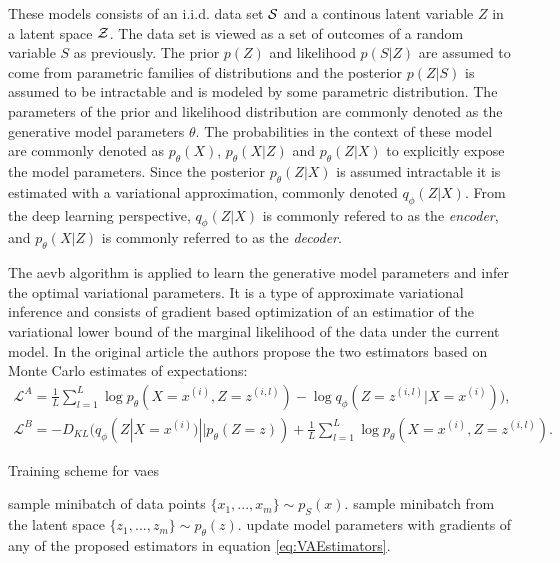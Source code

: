 These models consists of an i.i.d. data set $\mathcal{S}$ and a continous latent variable $Z$ in a latent space $\mathcal{Z}$. The data set is viewed as a set of outcomes of a random variable $S$ as previously. The prior $p(Z)$ and likelihood $p(S|Z)$ are assumed to come from parametric families of distributions and the posterior $p(Z|S)$ is assumed to be intractable and is modeled by some parametric distribution. The parameters of the prior and likelihood distribution are commonly denoted as the generative model parameters $\theta$. The probabilities in the context of these model are commonly denoted as $p_\theta(X)$, $p_\theta(X|Z)$ and $p_\theta(Z|X)$ to explicitly expose the model parameters. Since the posterior $p_\theta(Z|X)$ is assumed intractable it is estimated with a variational approximation, commonly denoted $q_\phi(Z|X)$. From the deep learning perspective, $q_\phi(Z|X)$ is commonly refered to as the \textit{encoder}, and $p_\theta(X|Z)$ is commonly referred to as the \textit{decoder}.

The \acrshort{aevb} algorithm is applied to learn the generative model parameters and infer the optimal variational parameters. It is a type of approximate variational inference and consists of gradient based optimization of an estimatior of the variational lower bound of the marginal likelihood of the data under the current model. In the original article the authors propose the two estimators based on Monte Carlo estimates of expectations:
\begin{equation}
    \label{eq:VAEstimators}
    \begin{aligned}
        \mathcal{L}^A = \frac{1}{L}\sum_{l=1}^L \log p_\theta (X=x^{(i)},Z=z^{(i, l)}) - \log q_\phi (Z=z^{(i, l)} | X=x^{(i)}) ), \\
        \mathcal{L}^B = - D_{KL}(q_\phi (Z | X=x^{(i)}) || p_\theta(Z=z)) + \frac{1}{L}\sum_{l=1}^L \log p_\theta (X=x^{(i)},Z=z^{(i, l)}).
    \end{aligned}
\end{equation}

\begin{algorithm}
    \caption{Training scheme for \acrlong{vaes}}
    \label{alg:VAEbase}
    \begin{algorithmic}[1]
        \STATE sample minibatch of data points $\{x_{1}, ..., x_{m}\} \sim p_S(x)$.
        \STATE sample minibatch from the latent space $\{z_1, ..., z_m\} \sim p_\theta(z)$.
        \STATE update model parameters with gradients of any of the proposed estimators in equation \ref{eq:VAEstimators}.
        \ENDFOR
    \end{algorithmic}
\end{algorithm}

